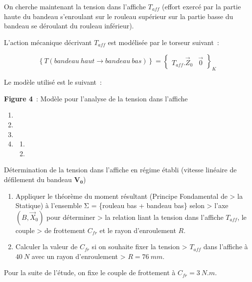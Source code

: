 On cherche maintenant la tension dans l'affiche \(T_{aff}\) (effort exercé par la partie haute du bandeau s'enroulant sur le rouleau supérieur sur la partie basse du bandeau se déroulant du rouleau inférieur).

L'action mécanique décrivant \(T_{aff}\) est modélisée par le torseur suivant~:

\[\left\{ T(bandeau\ haut \rightarrow bandeau\ bas) \right\} = \begin{Bmatrix}
T_{aff}.{\overrightarrow{Z}}_{0} & \overrightarrow{0}
\end{Bmatrix}_{K}\]

Le modèle utilisé est le suivant~:

\textbf{Figure 4}~: Modèle pour l'analyse de la tension dans l'affiche

\begin{enumerate}
\def\labelenumi{\arabic{enumi}.}
\item
\item
\item
\item
  \begin{enumerate}
  \def\labelenumii{\arabic{enumii}.}
  \tightlist
  \item
  \item
  \end{enumerate}
\end{enumerate}

Détermination de la tension dans l'affiche en régime établi (vitesse linéaire de défilement du bandeau \(\mathbf{V}_{\mathbf{0}}\))

\begin{enumerate}
\def\labelenumi{\arabic{enumi}.}
\setcounter{enumi}{5}
\item
  Appliquer le théorème du moment résultant (Principe Fondamental de \textgreater{} la Statique) à l'ensemble Σ = \{rouleau bas + bandeau bas\} selon \textgreater{} l'axe \(\left( B,{\overrightarrow{X}}_{0} \right)\) pour déterminer \textgreater{} la relation liant la tension dans l'affiche \(T_{aff}\), le couple \textgreater{} de frottement \(C_{fr}\) et le rayon d'enroulement \(R\).
\item
  Calculer la valeur de \(C_{fr}\) si on souhaite fixer la tension \textgreater{} \(T_{aff}\) dans l'affiche à \(40\ N\) avec un rayon d'enroulement \textgreater{} \(R = 76\ mm\).
\end{enumerate}

Pour la suite de l'étude, on fixe le couple de frottement à \(C_{fr} = 3\ N.m\).

